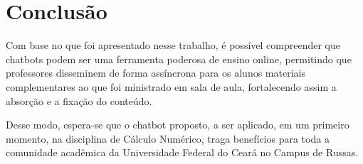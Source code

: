 \chapter{Conclusão}
\label{cap:conclusao}

Com base no que foi apresentado nesse trabalho, é possível compreender que chatbots podem ser uma ferramenta poderosa de ensino online, permitindo que professores disseminem de forma assíncrona para os alunos materiais complementares ao que foi ministrado em sala de aula, fortalecendo assim a absorção e a fixação do conteúdo.

Desse modo, espera-se que o chatbot proposto, a ser aplicado, em um primeiro momento, na disciplina de Cálculo Numérico, traga benefícios para toda a comunidade acadêmica da Universidade Federal do Ceará no Campus de Russas.